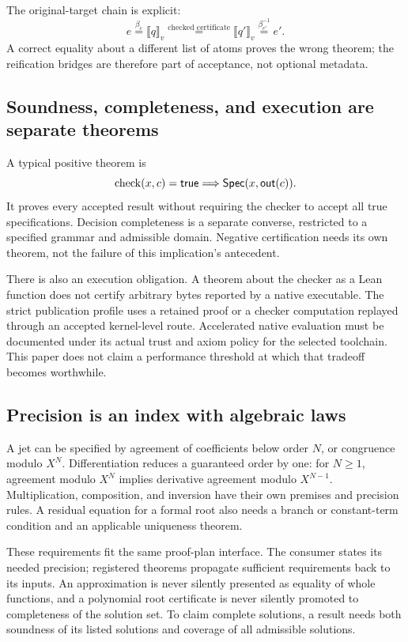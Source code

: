 \documentclass[11pt,a4paper]{article}
\newcommand{\xlongequal}[1]{\mathrel{\overset{#1}{=}}}
\numberwithin{equation}{section}
\theoremstyle{definition}\newtheorem{definition}[theorem]{Definition}
\theoremstyle{remark}\newtheorem{remark}[theorem]{Remark}
\begin{document}
The original-target chain is explicit:
\[
 e \xlongequal{\beta_e}\llbracket q\rrbracket_v
 \xlongequal{\text{checked certificate}}\llbracket q'\rrbracket_v
 \xlongequal{\beta_{e'}^{-1}}e'.
\]
A correct equality about a different list of atoms proves the wrong theorem;
the reification bridges are therefore part of acceptance, not optional
metadata.

\subsection{Soundness, completeness, and execution are separate theorems}
A typical positive theorem is
\[
 \operatorname{check}(x,c)=\mathsf{true}\Longrightarrow\mathsf{Spec}(x,\mathsf{out}(c)).
\]
It proves every accepted result without requiring the checker to accept all
true specifications. Decision completeness is a separate converse, restricted
to a specified grammar and admissible domain. Negative certification needs its
own theorem, not the failure of this implication's antecedent.

There is also an execution obligation. A theorem about the checker as a Lean
function does not certify arbitrary bytes reported by a native executable.
The strict publication profile uses a retained proof or a checker computation
replayed through an accepted kernel-level route. Accelerated native evaluation
must be documented under its actual trust and axiom policy for the selected
toolchain. This paper does not claim a performance threshold at which that
tradeoff becomes worthwhile.

\subsection{Precision is an index with algebraic laws}
A jet can be specified by agreement of coefficients below order \(N\), or
congruence modulo \(X^N\). Differentiation reduces a guaranteed order by one:
for \(N\ge1\), agreement modulo \(X^N\) implies derivative agreement modulo
\(X^{N-1}\). Multiplication, composition, and inversion have their own
premises and precision rules. A residual equation for a formal root also
needs a branch or constant-term condition and an applicable uniqueness theorem.

These requirements fit the same proof-plan interface. The consumer states its
needed precision; registered theorems propagate sufficient requirements back
to its inputs. An approximation is never silently presented as equality of
whole functions, and a polynomial root certificate is never silently promoted
to completeness of the solution set. To claim complete solutions, a result
needs both soundness of its listed solutions and coverage of all admissible
solutions.
\end{document}
